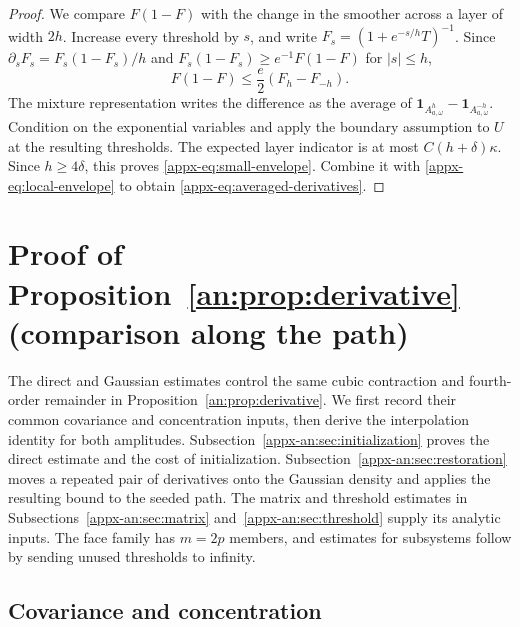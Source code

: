 \documentclass[11pt,letterpaper]{article}
\newenvironment{recovered}{}{}
\newcommand{\vSix}[1]{{\color{magenta}#1}}
\theoremstyle{remark}
\newcommand{\ind}{\mathbf 1}
\begin{document}
\begin{proof}
We compare \(F(1-F)\) with the change in the smoother across a layer
of width \(2h\). Increase every threshold by \(s\), and write
\(F_s=(1+e^{-s/h}T)^{-1}\). Since
\(\partial_sF_s=F_s(1-F_s)/h\) and
\(F_s(1-F_s)\ge e^{-1}F(1-F)\) for \(|s|\le h\),
\begin{recovered}
\begin{equation}\label{appx-eq:F(1-F)}
 F(1-F)\le\frac e2(F_h-F_{-h}).
\end{equation}
\end{recovered}
The mixture representation writes the difference as the average of
\(\ind_{A_{a,\omega}^h}-\ind_{A_{a,\omega}^{-h}}\).
\vSix{Condition on the exponential variables and apply the boundary
assumption to \(U\) at the resulting thresholds. The expected layer
indicator is at most \(C(h+\delta)\kappa\). Since \(h\ge4\delta\),
this proves}
\eqref{appx-eq:small-envelope}. Combine it with
\eqref{appx-eq:local-envelope} to obtain
\eqref{appx-eq:averaged-derivatives}.
\end{proof}

\section{Proof of Proposition~\ref*{an:prop:derivative} (comparison along the path)}
\label{appx-sec:support}

The direct and Gaussian estimates control the same cubic contraction
and fourth-order remainder in Proposition~\ref{an:prop:derivative}.
We first record their common covariance and concentration inputs,
then derive the interpolation identity for both amplitudes.
Subsection~\ref{appx-an:sec:initialization} proves the
direct estimate and the cost of initialization. Subsection~\ref{appx-an:sec:restoration}
moves a repeated pair of derivatives onto the Gaussian density and
applies the resulting bound to the seeded path.
The matrix and threshold estimates in Subsections~\ref{appx-an:sec:matrix}
and~\ref{appx-an:sec:threshold} supply its analytic inputs. The face
family has \(m=2p\) members, and estimates for subsystems follow by
sending unused thresholds to infinity.

\subsection{Covariance and concentration}
\label{appx-an:sec:coords}
\end{document}
